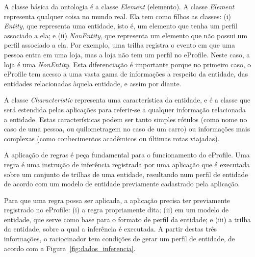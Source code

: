 \documentclass[times, 10pt, twocolumn]{article}
\begin{document}
A classe básica da ontologia é a classe {\em Element} (elemento). A classe {\em Element} representa qualquer coisa no mundo real. Ela tem como filhos as classes: (i) {\it Entity},  que representa uma entidade, isto é, um elemento que tenha um perfil associado a ela; e (ii) {\it NonEntity}, que representa um elemento que não possui um perfil associado a ela. Por exemplo, uma trilha registra o evento em que uma pessoa entra em uma loja, mas a loja não tem um perfil no eProfile. Neste caso, a loja é uma {\it NonEntity}. Esta diferenciação é importante porque no primeiro caso, o eProfile tem acesso a uma vasta gama de informações a respeito da entidade, das entidades relacionadas àquela entidade, e assim por diante.

A classe {\em Characteristic} representa uma característica da entidade, e é a classe que será estendida pelas aplicações para referir-se a qualquer informação relacionada a entidade. Estas características podem ser tanto simples rótulos (como nome no caso de uma pessoa, ou quilometragem no caso de um carro) ou informações mais complexas (como conhecimentos acadêmicos ou últimas rotas viajadas).




A aplicação de regras é peça fundamental para o funcionamento do eProfile. Uma regra é uma instrução de inferência registrada por uma aplicação que é executada sobre um conjunto de trilhas de uma entidade, resultando num perfil de entidade de acordo com um modelo de entidade previamente cadastrado pela aplicação.

Para que uma regra possa ser aplicada, a aplicação precisa ter previamente registrado no eProfile: (i) a regra propriamente dita; (ii) em um modelo de entidade, que serve como base para o formato de perfil da entidade; e (iii) a trilha da entidade, sobre a qual a inferência é executada. A partir destas três informações, o raciocinador tem condições de gerar um perfil de entidade, de acordo com a Figura~\ref{fig:dados_inferencia}.
\end{document}
